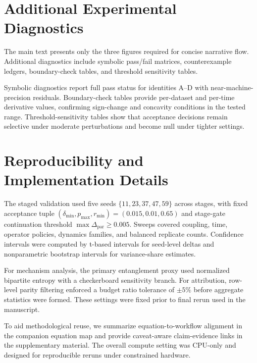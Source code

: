 \documentclass{article} %
\begin{document}
\section{Additional Experimental Diagnostics}
The main text presents only the three figures required for concise narrative flow. Additional diagnostics include symbolic pass/fail matrices, counterexample ledgers, boundary-check tables, and threshold sensitivity tables.

Symbolic diagnostics report full pass status for identities A--D with near-machine-precision residuals. Boundary-check tables provide per-dataset and per-time derivative values, confirming sign-change and concavity conditions in the tested range. Threshold-sensitivity tables show that acceptance decisions remain selective under moderate perturbations and become null under tighter settings.

\section{Reproducibility and Implementation Details}
The staged validation used five seeds $\{11,23,37,47,59\}$ across stages, with fixed acceptance tuple $(\delta_{\min},p_{\max},r_{\min})=(0.015,0.01,0.65)$ and stage-gate continuation threshold $\max\Delta_{\mathrm{par}}\ge 0.005$. Sweeps covered coupling, time, operator policies, dynamics families, and balanced replicate counts. Confidence intervals were computed by t-based intervals for seed-level deltas and nonparametric bootstrap intervals for variance-share estimates.

For mechanism analysis, the primary entanglement proxy used normalized bipartite entropy with a checkerboard sensitivity branch. For attribution, row-level parity filtering enforced a budget ratio tolerance of $\pm5\%$ before aggregate statistics were formed. These settings were fixed prior to final rerun used in the manuscript. 

To aid methodological reuse, we summarize equation-to-workflow alignment in the companion equation map and provide caveat-aware claim-evidence links in the supplementary material. The overall compute setting was CPU-only and designed for reproducible reruns under constrained hardware.
\end{document}
